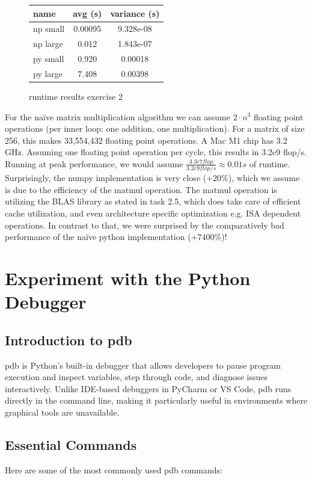 \documentclass[a4paper,12pt]{article}
\begin{document}
\begin{figure}[H]
  \centering
  \begin{tabular}{l|c|c}
    name & avg (s) & variance (s)\\\hline
    np small & 0.00095 & 9.328e-08\\
    np large & 0.012 & 1.843e-07\\
    py small & 0.920 & 0.00018\\
    py large & 7.408 & 0.00398\\
  \end{tabular}
  \caption{runtime results exercise 2}\label{tab:ex2}
\end{figure}

For the naïve matrix multiplication algorithm we can assume $2 \cdot n^{3}$ floating point operations (per inner loop: one addition, one multiplication).
For a matrix of size 256, this makes 33,554,432 floating point operations.
A Mac M1 chip has 3.2 GHz.
Assuming one floating point operation per cycle, this results in 3.2e9 flop/s.
Running at peak performance, we would assume
$\frac{3.3e7 flop}{3.2e9flop/s} \approx 0.01s$ of runtime.
Surprisingly, the numpy implementation is very close ($+20\%$), which we assume is due to the efficiency of the matmul operation. The matmul operation is utilizing the BLAS library as stated in task 2.5, which
 does take care of efficient cache utilization, and even architecture specific optimization e.g. ISA dependent operations. In contrast to that, we were surprised by the comparatively bad performance of the naïve python implementation ($+7400\%$)!


\section{Experiment with the Python Debugger}

\subsection{Introduction to pdb}
pdb is Python’s built-in debugger that allows developers to pause program execution and inspect variables, step through code, and diagnose issues interactively. Unlike IDE-based debuggers in PyCharm or VS Code, pdb runs directly in the command line, making it particularly useful in environments where graphical tools are unavailable.

\subsection{Essential Commands}
Here are some of the most commonly used pdb commands:
\end{document}
